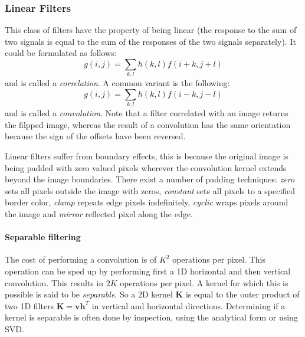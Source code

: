 \documentclass[a4paper,twocolumn]{article}
\begin{document}
\subsubsection{Linear Filters}
This class of filters have the property of being linear (the response to the sum
of two signals is equal to the sum of the responses of the two signals
separately). It could be formulated as follows:
\begin{equation}
g(i, j) = \sum_{k,l} h(k, l) f(i + k, j + l)
\end{equation}
and is called a \textit{correlation}. A common variant is the following:
\begin{equation}
g(i, j) = \sum_{k,l} h(k, l) f(i - k , j - l)
\end{equation}
and is called a \textit{convolution}. Note that a filter correlated with an
image returns the filpped image, whereas the result of a convolution has the
same orientation because the sign of the offsets have been reversed.

Linear filters suffer from boundary effects, this is because the original image
is being padded with zero valued pixels wherever the convolution kernel extends
beyond the image boundaries. There exist a number of padding techniques:
\textit{zero} sets all pixels outside the image with zeros, \textit{constant}
sets all pixels to a specified border color, \textit{clamp} repeats edge pixels
indefinitely, \textit{cyclic} wraps pixels around the image and \textit{mirror}
reflected pixel along the edge.

\paragraph{Separable filtering}
The cost of performing a convolution is of $K^2$ operations per pixel. This
operation can be sped up by performing first a 1D horizontal and then vertical
convolution. This results in $2K$ operations per pixel. A kernel for which this
is possible is said to be \textit{separable}. So a 2D kernel $\mathbf{K}$ is
equal to the outer product of two 1D filters
$\mathbf{K}=\mathbf{v}\mathbf{h}^T$ in vertical and horizontal directions.
Determining if a kernel is separable is often done by inspection, using the
analytical form or using SVD.
\end{document}
